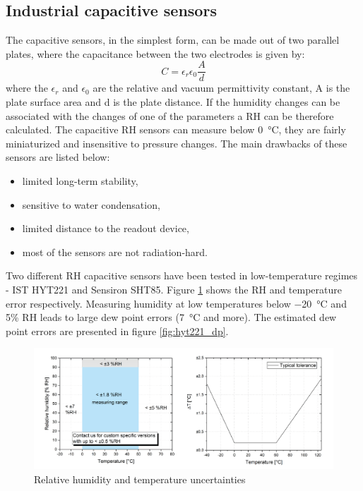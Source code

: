 \subsection{Industrial capacitive sensors}
\label{capacitive_sensors}
The capacitive sensors, in the simplest form, can be made out of two parallel plates, where the capacitance between the two electrodes is given by:
\begin{equation}
C = \epsilon_{r}\epsilon_0\frac{A}{d}
\end{equation}
where the $\epsilon_{r}$ and $\epsilon_{0}$ are the relative and vacuum permittivity constant, A is the plate surface area and d is the plate distance. If the humidity changes can be associated with the changes of one of the parameters a \gls{RH} can be therefore calculated. 
The capacitive \gls{RH} sensors can measure below \SI{0}{\celsius}, they are fairly miniaturized and insensitive to pressure changes. The main drawbacks of these sensors are listed below:
\begin{itemize}
    \item limited long-term stability,
    \item sensitive to water condensation,
    \item limited distance to the readout device,
    \item most of the sensors are not radiation-hard.
\end{itemize}
Two different \gls{RH} capacitive sensors have been tested in low-temperature regimes - IST HYT221 and Sensiron SHT85. Figure \ref{fig:hyt221} shows the \gls{RH} and temperature error respectively. Measuring humidity at low temperatures below \SI{-20}{\celsius} and 5\% \gls{RH} leads to large dew point errors (\SI{7}{\celsius} and more). The estimated dew point errors are presented in figure \ref{fig:hyt221_dp}.
\begin{figure}[!h]
\centering
\includegraphics[width=0.85\columnwidth]{Chapter5/images/hyt221_rh.png}
\caption{Relative humidity and temperature uncertainties \cite{hyt221}}
\label{fig:hyt221}
\end{figure}
